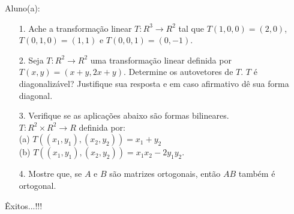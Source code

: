\documentclass[oneside,a4paper,12pt]{article}
\begin{document}
     \begin{flushleft}
     	Aluno(a):
     \end{flushleft}
 
\begin{itemize}
	\item[1.]Ache a transformação linear $T:R^{3}\longrightarrow R^{2}$ tal que $T(1,0,0)=(2,0)$, $T(0,1,0)=(1,1)$ e $T(0,0,1)=(0,-1)$.
\end{itemize}
\begin{itemize}
	\item[2.] Seja $T:R^{2}\longrightarrow R^{2}$ uma transformação linear definida por $T(x,y)=(x+y,2x+y)$. Determine os autovetores de $T$. $T$ é diagonalizável? Justifique sua resposta e em caso afirmativo dê sua forma diagonal. 
\end{itemize}
\begin{itemize}
	\item [3.] Verifique se as aplicações abaixo são formas bilineares.\\
	$T:R^{2}\times R^{2}\longrightarrow R$ definida por:\\ (a) $T((x_{1},y_{1}),(x_{2},y_{2}))=x_{1}+y_{2}$ \\
	(b) $T((x_{1},y_{1}),(x_{2},y_{2}))=x_{1}x_{2}-2y_{1}y_{2}$.
\end{itemize}
\begin{itemize}
	\item[4.] Mostre que, se $A$ e $B$ são matrizes ortogonais, então $AB$ também é ortogonal.
\end{itemize}
\flushbottom
\flushright
Êxitos...!!!
\end{document}
